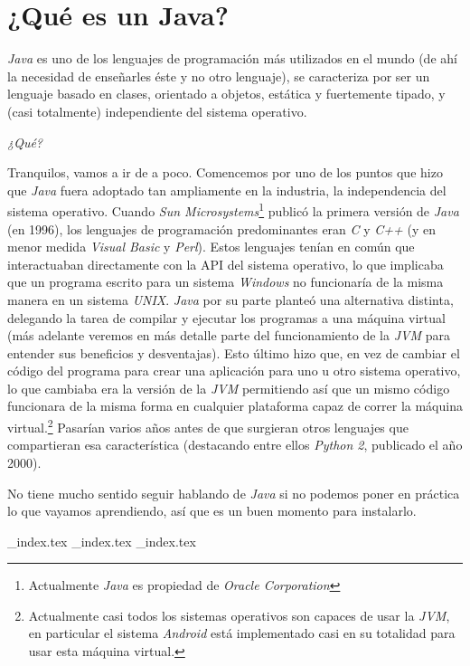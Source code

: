 \chapter{¿Qué es un Java?}
  \label{ch:java}
  \textit{Java} es uno de los lenguajes de programación más utilizados en el mundo (de ahí la 
  necesidad de enseñarles éste y no otro lenguaje), se caracteriza por ser un lenguaje basado en 
  clases, orientado a objetos, estática y fuertemente tipado, y (casi totalmente) independiente del sistema 
  operativo.
  
  \begin{center}
    \textit{¿Qué?}
  \end{center}

  Tranquilos, vamos a ir de a poco.
  Comencemos por uno de los puntos que hizo que \textit{Java} fuera adoptado tan ampliamente en la
  industria, la independencia del sistema operativo.
  Cuando \textit{Sun Microsystems}\footnote{Actualmente \textit{Java} es propiedad de 
  \textit{Oracle Corporation}} publicó la primera versión de \textit{Java} (en 1996), los 
  lenguajes de programación predominantes eran \textit{C} y \textit{C++} (y en menor medida 
  \textit{Visual Basic} y \textit{Perl}).
  Estos lenguajes tenían en común que interactuaban directamente con la API del sistema operativo,
  lo que implicaba que un programa escrito para un sistema \textit{Windows} no funcionaría de la
  misma manera en un sistema \textit{UNIX}.
  \textit{Java} por su parte planteó una alternativa distinta, delegando la tarea de compilar y 
  ejecutar los programas a una máquina virtual (más adelante veremos en más detalle parte del 
  funcionamiento de la \textit{JVM} para entender sus beneficios y desventajas).
  Esto último hizo que, en vez de cambiar el código del programa para crear una aplicación para 
  uno u otro sistema operativo, lo que cambiaba era la versión de la \textit{JVM} permitiendo así
  que un mismo código funcionara de la misma forma en cualquier plataforma capaz de correr la 
  máquina virtual.\footnote{Actualmente casi todos los sistemas operativos son capaces de usar la 
  \textit{JVM}, en particular el sistema \textit{Android} está implementado casi en su totalidad 
  para usar esta máquina virtual.}
  Pasarían varios años antes de que surgieran otros lenguajes que compartieran esa característica
  (destacando entre ellos \textit{Python 2}, publicado el año 2000).

  No tiene mucho sentido seguir hablando de \textit{Java} si no podemos poner en práctica lo que 
  vayamos aprendiendo, así que es un buen momento para instalarlo.
  
  {_index.tex}
  {_index.tex}
  {_index.tex}

\printbibliography[keyword=Por_algo_se_empieza]